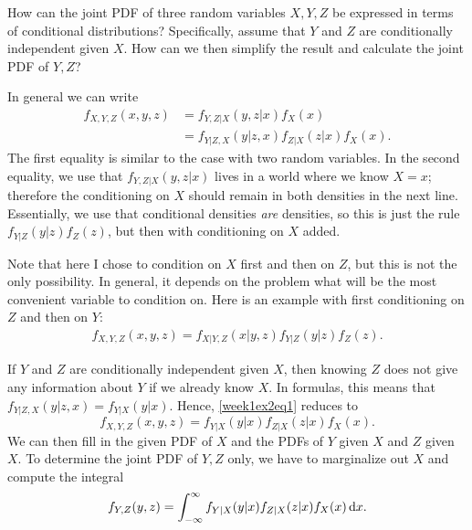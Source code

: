 \documentclass[a4paper,11pt]{article}
\begin{document}
\begin{exercise}
How can the joint PDF of three random variables $X, Y, Z$ be expressed in terms of conditional distributions? 
Specifically, assume that $Y$ and $Z$ are conditionally independent given $X$. How can we then simplify the result and calculate the joint PDF of $Y, Z$? 

\begin{solution}
In general we can write 
\begin{align}
f_{X, Y, Z}(x,y,z) &= f_{Y, Z|X}(y, z|x) f_{X}(x) \\ 
&= f_{Y|Z, X}(y|z, x) f_{Z|X}(z|x) f_{X}(x).  \label{week1ex2eq1}
\end{align}
The first equality is similar to the case with two random variables. In the second equality, we use that $ f_{Y, Z|X}(y, z|x)$ lives in a world where we know $X = x$; therefore the conditioning on $X$ should remain in both densities in the next line. Essentially, we use that conditional densities \textit{are} densities, so this is just the rule $ f_{Y|Z}(y|z) f_{Z}(z)$, but then with conditioning on $X$ added.

Note that here I chose to condition on $X$ first and then on $Z$, but this is not the only possibility. In general, it depends on the problem what will be the most convenient variable to condition on. Here is an example with first conditioning on $Z$ and then on $Y$:
\begin{align*}
f_{X, Y, Z}(x,y,z) = f_{X|Y, Z}(x|y, z) f_{Y|Z}(y|z) f_{Z}(z).
\end{align*}

If  $Y$ and $Z$ are conditionally independent given $X$, then knowing $Z$ does not give any information about $Y$ if we already know $X$. In formulas, this means that $ f_{Y|Z, X}(y|z, x) =  f_{Y|X}(y|x)$. Hence, \eqref{week1ex2eq1} reduces to
\begin{equation}
f_{X, Y, Z}(x,y,z) = f_{Y|X}(y|x) f_{Z|X}(z|x) f_{X}(x).  
\end{equation}
We can then fill in the given PDF of $X$ and the PDFs of $Y$ given $X$ and $Z$ given $X$. To determine the joint PDF of $Y, Z$ only, we have to marginalize out $X$ and compute the integral
\begin{equation}
f_{Y, Z}(y,z) = \int_{-\infty}^{\infty} f_{Y|X}(y|x) f_{Z|X}(z|x) f_{X}(x) \,\textrm{d}x.  
\end{equation}
\end{solution}
\end{exercise}


\end{document}
